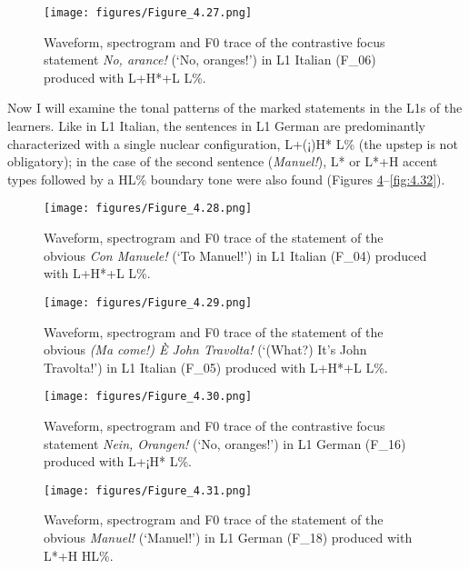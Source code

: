 \begin{figure}


\texttt{[image: figures/Figure\_4.27.png]}


\caption{Waveform, spectrogram and F0 trace of the contrastive focus statement \textit{No, arance!} (‘No, oranges!’) in L1 Italian \mbox{(F\_06)} produced with L+H*+L L\%.}
\label{fig:4.27}
\end{figure}

Now I will examine the tonal patterns of the marked statements in the L1s of the learners. Like in L1 Italian, the sentences in L1 German are predominantly characterized with a single nuclear configuration, L+(¡)H* L\% (the upstep is not obligatory); in the case of the second sentence (\textit{Manuel!}), L* or L*+H accent types followed by a HL\% boundary tone were also found (Figures \ref{fig:4.30}--\ref{fig:4.32}).\pagebreak

\begin{figure}
\texttt{[image: figures/Figure\_4.28.png]}
\caption{Waveform, spectrogram and F0 trace of the statement of the obvious \textit{Con Manuele!} (‘To Manuel!’) in L1 Italian \mbox{(F\_04)} produced with L+H*+L L\%.}
\label{fig:4.28}
\end{figure}

\begin{figure}
\texttt{[image: figures/Figure\_4.29.png]}
\caption{Waveform, spectrogram and F0 trace of the statement of the obvious \textit{(Ma come!) È John Travolta!} (‘(What?) It’s John Travolta!’) in L1 Italian \mbox{(F\_05)} produced with L+H*+L L\%.}
\label{fig:4.29}
\end{figure}

\begin{figure}
\texttt{[image: figures/Figure\_4.30.png]}
\caption{Waveform, spectrogram and F0 trace of the contrastive focus statement \textit{Nein, Orangen!} (‘No, oranges!’) in L1 German \mbox{(F\_16)} produced with L+¡H* L\%.}
\label{fig:4.30}
\end{figure}

\begin{figure}
\texttt{[image: figures/Figure\_4.31.png]}
\caption{Waveform, spectrogram and F0 trace of the statement of the obvious \textit{Manuel!} (‘Manuel!’) in L1 German \mbox{(F\_18)} produced with L*+H HL\%.}
\label{fig:4.31}
\end{figure}

